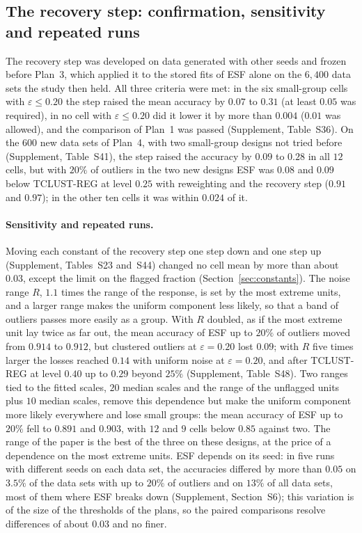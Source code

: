 \subsection{The recovery step: confirmation, sensitivity and repeated runs}
\label{sec:gate2}

The recovery step was developed on data generated with other seeds and frozen before Plan~3,
which applied it to the stored fits of ESF alone on the $6{,}400$ data sets the study then
held. All three criteria were met: in the six small-group cells with $\varepsilon\le0.20$ the
step raised the mean accuracy by $0.07$ to $0.31$ (at least $0.05$ was required), in no cell
with $\varepsilon\le0.20$ did it lower it by more than $0.004$ ($0.01$ was allowed), and the
comparison of Plan~1 was passed (Supplement, Table~S36). On the $600$ new data sets of Plan~4,
with two small-group designs not tried before (Supplement, Table~S41), the step raised the
accuracy by $0.09$ to $0.28$ in all $12$ cells, but with $20\%$ of outliers in the two new
designs ESF was $0.08$ and $0.09$ below TCLUST-REG at level $0.25$ with reweighting and the
recovery step ($0.91$ and $0.97$); in the other ten cells it was within $0.024$ of it.

\paragraph{Sensitivity and repeated runs.} Moving each constant of the recovery step one step
down and one step up (Supplement, Tables~S23 and~S44) changed no cell mean by more than about
$0.03$, except the limit on the flagged fraction (Section~\ref{sec:constants}). The noise range
$R$, $1.1$ times the range of the response, is set by the most extreme units, and a larger range
makes the uniform component less likely, so that a band of outliers passes more easily as a
group. With $R$ doubled, as if the most extreme unit lay twice as far out, the mean accuracy of
ESF up to $20\%$ of outliers moved from $0.914$ to $0.912$, but clustered outliers at
$\varepsilon=0.20$ lost $0.09$; with $R$ five times larger the losses reached $0.14$ with uniform
noise at $\varepsilon=0.20$, and after TCLUST-REG at level $0.40$ up to $0.29$ beyond $25\%$
(Supplement, Table~S48). Two ranges tied to the fitted scales, $20$ median scales and the range
of the unflagged units plus $10$ median scales, remove this dependence but make the uniform
component more likely everywhere and lose small groups: the mean accuracy of ESF up to $20\%$
fell to $0.891$ and $0.903$, with $12$ and $9$ cells below $0.85$ against two. The range of the
paper is the best of the three on these designs, at the price of a dependence on the most
extreme units. ESF depends on
its seed: in five runs with different seeds on each data set, the accuracies differed by more
than $0.05$ on $3.5\%$ of the data sets with up to $20\%$ of outliers and on $13\%$ of all
data sets, most of them where ESF breaks down (Supplement, Section~S6); this variation is of
the size of the thresholds of the plans, so the paired comparisons resolve differences of
about $0.03$ and no finer.

